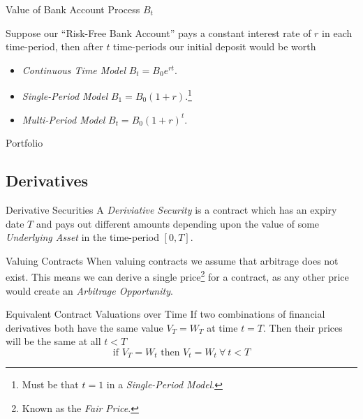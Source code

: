 \documentclass[11pt,a4paper]{article}
\begin{document}
  \begin{proposition}{Value of Bank Account Process $B_t$}
    \par Suppose our ``Risk-Free Bank Account'' pays a constant interest rate of $r$ in each time-period, then after $t$ time-periods our initial deposit would be worth
    \begin{itemize}
      \item \textit{Continuous Time Model} $B_t=B_0e^{rt}$.
      \item \textit{Single-Period Model} $B_1=B_0(1+r)$.\footnote{Must be that $t=1$ in a \textit{Single-Period Model}.}
      \item \textit{Multi-Period Model} $B_t=B_0(1+r)^t$.
    \end{itemize}
  \end{proposition}

  \begin{definition}{Portfolio}
  \end{definition}

\subsection{Derivatives}

  \begin{definition}{Derivative Securities}
    A \textit{Deriviative Security} is a contract which has an expiry date $T$ and pays out different amounts depending upon the value of some \textit{Underlying Asset} in the time-period $[0,T]$.
  \end{definition}

  \begin{remark}{Valuing Contracts}
    When valuing contracts we assume that arbitrage does not exist. This means we can derive a single price\footnote{Known as the \textit{Fair Price}.} for a contract, as any other price would create an \textit{Arbitrage Opportunity}.
  \end{remark}

  \begin{theorem}{Equivalent Contract Valuations over Time}\label{the_equivalent_contract_valuations_over_time}
    If two combinations of financial derivatives both have the same value $V_T=W_T$ at time $t=T$. Then their prices will be the same at all $t<T$
    \[ \text{if }V_T=W_t\text{ then }V_t=W_t\ \forall\ t<T \]
  \end{theorem}
\end{document}
